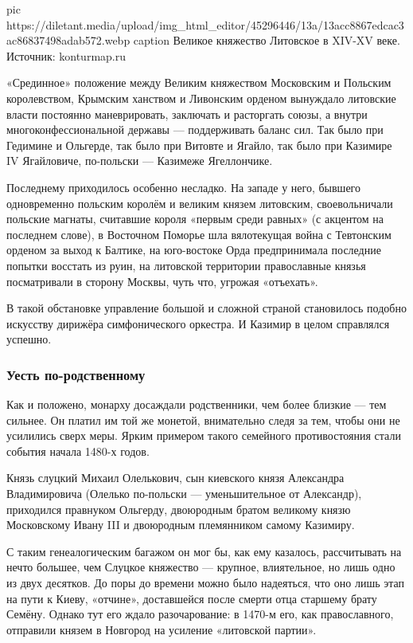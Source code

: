\ifcmt
  pic https://diletant.media/upload/img_html_editor/45296446/13a/13acc8867edcac3ac86837498adab572.webp
  caption Великое княжество Литовское в XIV-XV веке. Источник: konturmap.ru
\fi

«Срединное» положение между Великим княжеством Московским и Польским
королевством, Крымским ханством и Ливонским орденом вынуждало литовские власти
постоянно маневрировать, заключать и расторгать союзы, а внутри
многоконфессиональной державы — поддерживать баланс сил. Так было при Гедимине
и Ольгерде, так было при Витовте и Ягайло, так было при Казимире IV
Ягайловиче, по-польски — Казимеже Ягеллончике.

Последнему приходилось особенно несладко. На западе у него, бывшего
одновременно польским королём и великим князем литовским, своевольничали
польские магнаты, считавшие короля «первым среди равных» (с акцентом на
последнем слове), в Восточном Поморье шла вялотекущая война с Тевтонским
орденом за выход к Балтике, на юго-востоке Орда предпринимала последние попытки
восстать из руин, на литовской территории православные князья посматривали в
сторону Москвы, чуть что, угрожая «отъехать».

В такой обстановке управление большой и сложной страной становилось подобно
искусству дирижёра симфонического оркестра. И Казимир в целом справлялся
успешно. 

\subsubsection{Уесть по-родственному}

Как и положено, монарху досаждали родственники, чем более близкие — тем
сильнее. Он платил им той же монетой, внимательно следя за тем, чтобы они не
усилились сверх меры. Ярким примером такого семейного противостояния стали
события начала 1480-х годов.

Князь слуцкий Михаил Олелькович, сын киевского князя Александра Владимировича
(Олелько по-польски — уменьшительное от Александр), приходился правнуком
Ольгерду, двоюродным братом великому князю Московскому Ивану III и двоюродным
племянником самому Казимиру.

С таким генеалогическим багажом он мог бы, как ему казалось, рассчитывать на
нечто большее, чем Слуцкое княжество — крупное, влиятельное, но лишь одно из
двух десятков. До поры до времени можно было надеяться, что оно лишь этап на
пути к Киеву, «отчине», доставшейся после смерти отца старшему брату Семёну.
Однако тут его ждало разочарование: в 1470-м его, как православного, отправили
князем в Новгород на усиление «литовской партии». 

